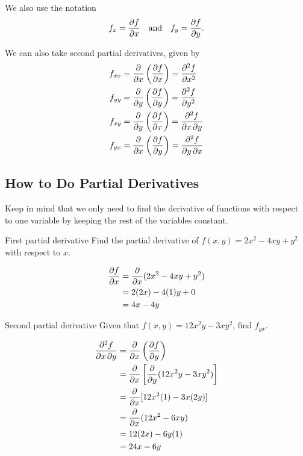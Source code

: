 \begin{notation}
We also use the notation
\[ f_x=\pdv{f}{x} \quad \text{and} \quad f_y=\pdv{f}{y}. \]
\end{notation}

\begin{notation}
We can also take second partial derivatives, given by
\[ \begin{split}
f_{xx} &= \pdv{}{x}\left(\pdv{f}{x}\right) = \pdv[order={2}]{f}{x} \\
f_{yy} &= \pdv{}{y}\left(\pdv{f}{y}\right) = \pdv[order={2}]{f}{y} \\
f_{xy} &= \pdv{}{y}\left(\pdv{f}{x}\right) = \pdv{f}{x,y} \\
f_{yx} &= \pdv{}{x}\left(\pdv{f}{y}\right) = \pdv{f}{y,x}
\end{split} \]
\end{notation}

\subsection{How to Do Partial Derivatives}
Keep in mind that we only need to find the derivative of functions with respect to one variable by keeping the rest of the variables constant.

\begin{exmp}{First partial derivative}{}
Find the partial derivative of $f(x,y)=2x^2-4xy+y^2$ with respect to $x$.
\end{exmp}
\begin{solution}
\begin{align*}
\pdv{f}{x}
&= \pdv{}{x}(2x^2-4xy+y^2) \\
&= 2(2x) - 4(1)y + 0\\
&= 4x - 4y 
\end{align*}
\end{solution}

\begin{exmp}{Second partial derivative}{}
Given that $f(x,y)=12x^2y-3xy^2$, find $f_{yx}$.
\end{exmp}
\begin{solution}
\begin{align*}
\pdv{f}{x,y}
&= \pdv{}{x} \left(\pdv{f}{y}\right) \\
&= \pdv{}{x} \left[\pdv{}{y} (12x^2y - 3xy^2)\right] \\
&= \pdv{}{x}[12x^2(1) - 3x(2y)]\\
&= \pdv{}{x}(12x^2-6xy) \\
&= 12(2x)-6y(1) \\
&= 24x-6y
\end{align*}
\end{solution}

